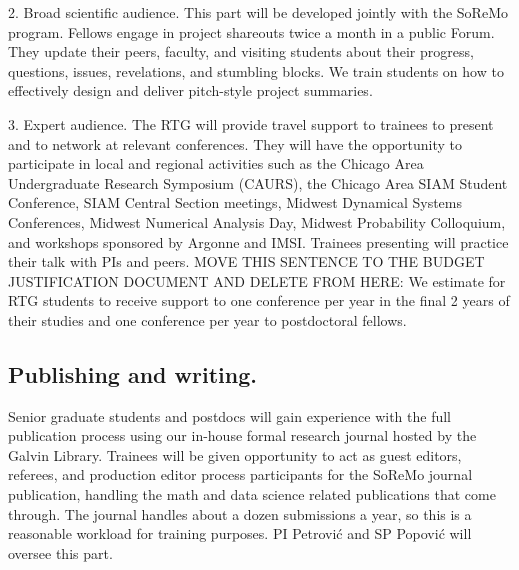 \documentclass[11pt]{NSFamsart}
\begin{document}
2. Broad scientific audience. %
This part will be developed jointly with the SoReMo program. Fellows engage in project shareouts twice a month in a public Forum. They update their peers, faculty, and visiting students  about their progress, questions, issues, revelations, and stumbling blocks. We  train students on how to effectively design and deliver pitch-style project summaries.

3. Expert audience. %
The RTG will provide travel support to trainees to  present   and to network at relevant conferences. 
They will have the opportunity to participate in local and regional activities such as the Chicago Area Undergraduate Research Symposium (CAURS), the Chicago Area SIAM Student Conference, SIAM Central Section meetings, Midwest Dynamical Systems Conferences, Midwest Numerical Analysis Day,  Midwest Probability Colloquium, and workshops sponsored by Argonne and IMSI. Trainees presenting will practice their talk  with PIs and peers.
{\color{red}MOVE THIS SENTENCE TO THE BUDGET JUSTIFICATION DOCUMENT AND DELETE FROM HERE: We estimate for RTG students to receive support to one conference per year in the final 2 years of their studies and one conference per year to postdoctoral fellows. } 


\subsection*{Publishing and writing.} Senior graduate students and postdocs will gain experience with the full publication process using our in-house formal research journal hosted by the Galvin Library. Trainees will be given opportunity to act as guest editors, referees, and production editor process participants for the SoReMo journal publication, handling the math and data science related publications that come through. The journal handles about a dozen submissions a year, so this is a reasonable workload for training purposes. PI Petrovi\'c and SP Popovi\'c will oversee this  part. 
\end{document}
